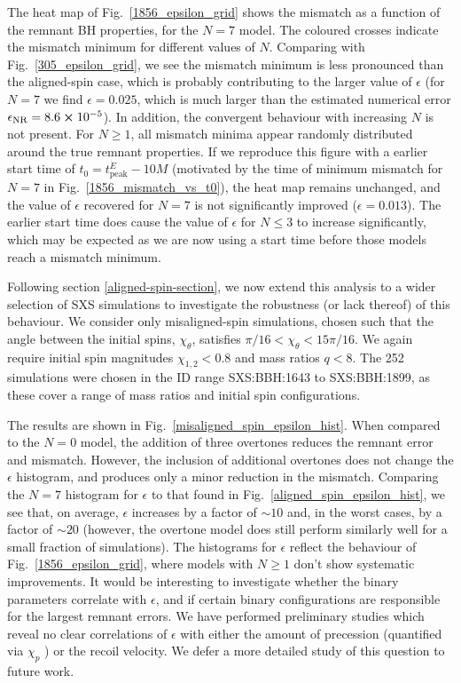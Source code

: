The heat map of Fig.~\ref{1856_epsilon_grid} shows the mismatch as a function of the remnant BH properties, for the $N=7$ model.
The coloured crosses indicate the mismatch minimum for different values of $N$. 
Comparing with Fig.~\ref{305_epsilon_grid}, we see the mismatch minimum is less pronounced than the aligned-spin case, which is probably contributing to the larger value of $\epsilon$ (for $N=7$ we find $\epsilon = 0.025$, which is much larger than the estimated numerical error $\epsilon_{\mathrm{NR}} = 8.6 \cross 10^{-5}$). 
In addition, the convergent behaviour with increasing $N$ is not present. For $N \geq 1$, all mismatch minima appear randomly distributed around the true remnant properties.
If we reproduce this figure with a earlier start time of $t_0 = t_{\mathrm{peak}}^{\dot{E}} - 10M$ (motivated by the time of minimum mismatch for $N=7$ in Fig.~\ref{1856_mismatch_vs_t0}), the heat map remains unchanged, and the value of $\epsilon$ recovered for $N=7$ is not significantly improved ($\epsilon = 0.013$). The earlier start time does cause the value of $\epsilon$ for $N \leq 3$ to increase significantly, which may be expected as we are now using a start time before those models reach a mismatch minimum. 

Following section \ref{aligned-spin-section}, we now extend this analysis to a wider selection of SXS simulations to investigate the robustness (or lack thereof) of this behaviour. We consider only misaligned-spin simulations, chosen such that the angle between the initial spins, $\chi_{\theta}$, satisfies $\pi/16 < \chi_{\theta} < 15\pi/16$. We again require initial spin magnitudes $\chi_{1,2} < 0.8$ and mass ratios $q<8$. The 252 simulations were chosen in the ID range SXS:BBH:1643 to SXS:BBH:1899, as these cover a range of mass ratios and initial spin configurations.

The results are shown in Fig.~\ref{misaligned_spin_epsilon_hist}. 
When compared to the $N=0$ model, the addition of three overtones reduces the remnant error and mismatch. 
However, the inclusion of additional overtones does not change the $\epsilon$ histogram, and produces only a minor reduction in the mismatch.
Comparing the $N=7$ histogram for $\epsilon$ to that found in Fig.~\ref{aligned_spin_epsilon_hist}, we see that, on average, $\epsilon$ increases by a factor of $\sim 10$ and, in the worst cases, by a factor of $\sim 20$ (however, the overtone model does still perform similarly well for a small fraction of simulations). 
The histograms for $\epsilon$ reflect the behaviour of Fig.~\ref{1856_epsilon_grid}, where models with $N \geq 1$ don't show systematic improvements. 
It would be interesting to investigate whether the binary parameters correlate with $\epsilon$, and if certain binary configurations are responsible for the largest remnant errors. We have performed preliminary studies which reveal no clear correlations of $\epsilon$ with either the amount of precession (quantified via $\chi_p$ \cite{2015PhRvD..91b4043S}) or the recoil velocity. We defer a more detailed study of this question to future work.

